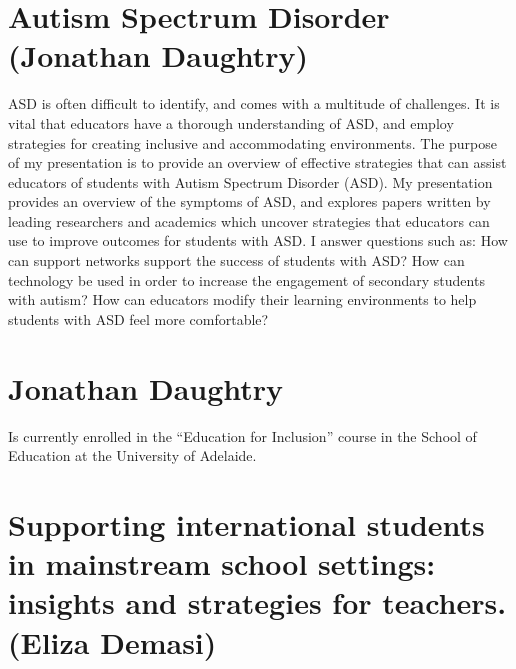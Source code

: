 \documentclass[twoside,14pt,a4paper,notitlepage]{memoir}
\begin{document}
\section*{Autism Spectrum Disorder (Jonathan Daughtry)}
\label{aut:daughtry}

ASD is often difficult to identify, and comes with a multitude of challenges. It is vital that educators have a thorough understanding of ASD, and employ strategies for creating inclusive and accommodating environments. The purpose of my presentation is to provide an overview of effective strategies that can assist educators of students with Autism Spectrum Disorder (ASD).
My presentation provides an overview of the symptoms of ASD, and explores papers written by leading researchers and academics which uncover strategies that educators can use to improve outcomes for students with ASD. I answer questions such as: How can support networks support the success of students with ASD? How can technology be used in order to increase the engagement of secondary students with autism? How can educators modify their learning environments to help students with ASD feel more comfortable?


\section*{Jonathan Daughtry}

Is currently enrolled in the ``Education for Inclusion'' course in the School of Education at the University of Adelaide.



\section*{Supporting international students in mainstream school settings: insights and strategies for teachers. (Eliza Demasi)}
\label{aut:demasi}
\end{document}
